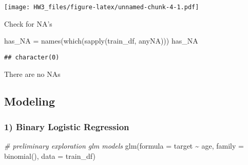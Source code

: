 \documentclass[
]{article}
\newenvironment{Shaded}{\begin{snugshade}}{\end{snugshade}}
\newcommand{\AttributeTok}[1]{\textcolor[rgb]{0.77,0.63,0.00}{#1}}
\newcommand{\CommentTok}[1]{\textcolor[rgb]{0.56,0.35,0.01}{\textit{#1}}}
\newcommand{\DecValTok}[1]{\textcolor[rgb]{0.00,0.00,0.81}{#1}}
\newcommand{\FunctionTok}[1]{\textcolor[rgb]{0.00,0.00,0.00}{#1}}
\newcommand{\NormalTok}[1]{#1}
\newcommand{\OtherTok}[1]{\textcolor[rgb]{0.56,0.35,0.01}{#1}}
\newcommand{\SpecialCharTok}[1]{\textcolor[rgb]{0.00,0.00,0.00}{#1}}
\begin{document}
\begin{Shaded}
\end{Shaded}

\texttt{[image: HW3\_files/figure-latex/unnamed-chunk-4-1.pdf]}

Check for NA's

\begin{Shaded}
\begin{Highlighting}[]
\NormalTok{has\_NA }\OtherTok{=} \FunctionTok{names}\NormalTok{(}\FunctionTok{which}\NormalTok{(}\FunctionTok{sapply}\NormalTok{(train\_df, anyNA)))}
\NormalTok{has\_NA}
\end{Highlighting}
\end{Shaded}

\begin{verbatim}
## character(0)
\end{verbatim}

There are no NAs

\hypertarget{modeling}{%
\subsection{Modeling}\label{modeling}}

\hypertarget{binary-logistic-regression}{%
\subsubsection{1) Binary Logistic
Regression}\label{binary-logistic-regression}}

\begin{Shaded}
\begin{Highlighting}[]
\CommentTok{\# preliminary exploration glm models}
\FunctionTok{glm}\NormalTok{(}\AttributeTok{formula =}\NormalTok{ target }\SpecialCharTok{\textasciitilde{}}\NormalTok{ age, }\AttributeTok{family =} \FunctionTok{binomial}\NormalTok{(), }\AttributeTok{data =}\NormalTok{ train\_df)}
\end{Highlighting}
\end{Shaded}
\end{document}
